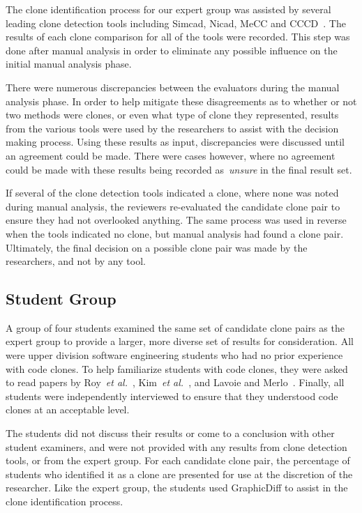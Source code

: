 \documentclass{sig-alternate}
\begin{document}
The clone identification process for our expert group was assisted by several leading clone detection tools including Simcad\cite{6613857}, Nicad\cite{Roy:2008:NAD:1437898.1438600}, MeCC\cite{Kim:2011:MMC:1985793.1985835} and CCCD~\cite{wcre2013}. The results of each clone comparison for all of the tools were recorded. This step was done after manual analysis in order to eliminate any possible influence on the initial manual analysis phase.

There were numerous discrepancies between the evaluators during the manual analysis phase. In order to help mitigate these disagreements as to whether or not two methods were clones, or even what type of clone they represented, results from the various tools were used by the researchers to assist with the decision making process. Using these results as input, discrepancies were discussed until an agreement could be made. There were cases however, where no agreement could be made with these results being recorded as~\emph{unsure} in the final result set.

If several of the clone detection tools indicated a clone, where none was noted during manual analysis, the reviewers re-evaluated the candidate clone pair to ensure they had not overlooked anything. The same process was used in reverse when the tools indicated no clone, but manual analysis had found a clone pair. Ultimately, the final decision on a possible clone pair was made by the researchers, and not by any tool.

\subsection{Student Group}
A group of four students examined the same set of candidate clone pairs as the expert group to provide a larger, more diverse set of results for consideration. All  were upper division software engineering students who had no prior experience with code clones. To help familiarize students with code clones, they were asked to read papers by Roy~\emph{et al.}~\cite{Roy:2009:CEC:1530898.1531101}, Kim~\emph{et al.}~\cite{Kim:2011:MMC:1985793.1985835}, and Lavoie and Merlo~\cite{Lavoie:2011:ATC:1985404.1985411}. Finally, all students were independently interviewed to ensure that they understood code clones at an acceptable level.

The students did not discuss their results or come to a conclusion with other student examiners, and were not provided with any results from clone detection tools, or from the expert group. For each candidate clone pair, the percentage of students who identified it as a clone are presented for use at the discretion of the researcher. Like the expert group, the students used GraphicDiff to assist in the clone identification process.
\end{document}
